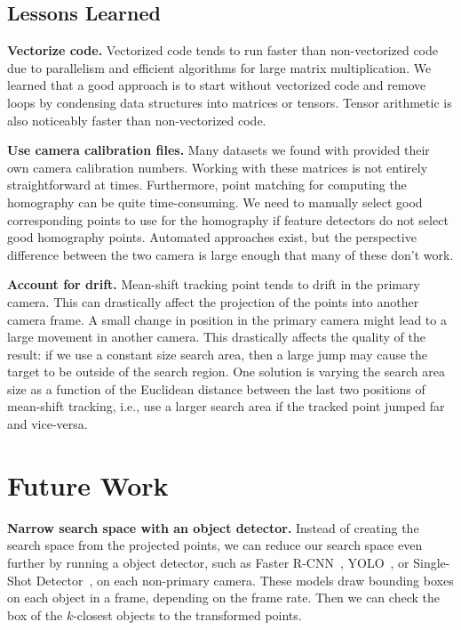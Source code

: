 \documentclass{article}
\begin{document}
\subsection{Lessons Learned}
\vspace{5pt}
\noindent\textbf{Vectorize code.} Vectorized code tends to run faster than non-vectorized code due to parallelism and efficient algorithms for large matrix multiplication. We learned that a good approach is to start without vectorized code and remove loops by condensing data structures into matrices or tensors. Tensor arithmetic is also noticeably faster than non-vectorized code.

\vspace{5pt}
\noindent\textbf{Use camera calibration files.} Many datasets we found with provided their own camera calibration numbers. Working with these matrices is not entirely straightforward at times. Furthermore, point matching for computing the homography can be quite time-consuming. We need to manually select good corresponding points to use for the homography if feature detectors do not select good homography points. Automated approaches exist, but the perspective difference between the two camera is large enough that many of these don't work.

\vspace{5pt}
\noindent\textbf{Account for drift.} Mean-shift tracking point tends to drift in the primary camera. This can drastically affect the projection of the points into another camera frame. A small change in position in the primary camera might lead to a large movement in another camera. This drastically affects the quality of the result: if we use a constant size search area, then a large jump may cause the target to be outside of the search region. One solution is varying the search area size as a function of the Euclidean distance between the last two positions of mean-shift tracking, i.e., use a larger search area if the tracked point jumped far and vice-versa.

\section{Future Work}
\label{sec:future}
\vspace{5pt}
\noindent\textbf{Narrow search space with an object detector.} Instead of creating the search space from the projected points, we can reduce our search space even further by running a object detector, such as Faster R-CNN~\cite{ren2015faster}, YOLO~\cite{redmon2016you}, or Single-Shot Detector~\cite{liu2016ssd}, on each non-primary camera. These models draw bounding boxes on each object in a frame, depending on the frame rate. Then we can check the box of the $k$-closest objects to the transformed points.
\end{document}
